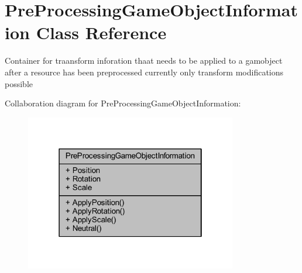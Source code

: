 \hypertarget{class_pre_processing_game_object_information}{}\section{Pre\+Processing\+Game\+Object\+Information Class Reference}
\label{class_pre_processing_game_object_information}


Container for traansform inforation thaat needs to be applied to a gamobject after a resource has been preprocessed currently only transform modifications possible  




Collaboration diagram for Pre\+Processing\+Game\+Object\+Information\+:
\nopagebreak
\begin{figure}[H]
\begin{center}
\leavevmode
\includegraphics[width=262pt]{class_pre_processing_game_object_information__coll__graph}
\end{center}
\end{figure}
